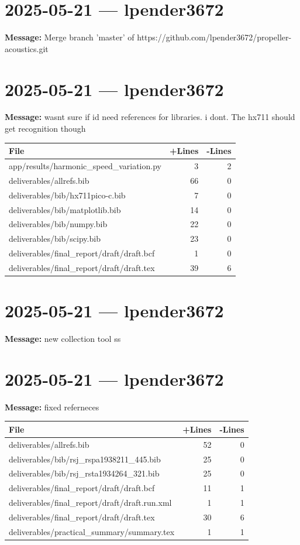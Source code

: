 \documentclass{article}
\begin{document}
\section*{2025-05-21 --- lpender3672}
\textbf{Message:} Merge branch 'master' of https://github.com/lpender3672/propeller-acoustics.git

\section*{2025-05-21 --- lpender3672}
\textbf{Message:} wasnt sure if id need references for libraries. i dont. The hx711 should get recognition though

\begin{longtable}{|p{10cm}|r|r|}
\hline \textbf{File} & \textbf{+Lines} & \textbf{-Lines} \\
\hline
app/results/harmonic\_speed\_variation.py & 3 & 2 \\
\hline
deliverables/allrefs.bib & 66 & 0 \\
\hline
deliverables/bib/hx711pico-c.bib & 7 & 0 \\
\hline
deliverables/bib/matplotlib.bib & 14 & 0 \\
\hline
deliverables/bib/numpy.bib & 22 & 0 \\
\hline
deliverables/bib/scipy.bib & 23 & 0 \\
\hline
deliverables/final\_report/draft/draft.bcf & 1 & 0 \\
\hline
deliverables/final\_report/draft/draft.tex & 39 & 6 \\
\hline
\end{longtable}

\section*{2025-05-21 --- lpender3672}
\textbf{Message:} new collection tool ss

\section*{2025-05-21 --- lpender3672}
\textbf{Message:} fixed referneces

\begin{longtable}{|p{10cm}|r|r|}
\hline \textbf{File} & \textbf{+Lines} & \textbf{-Lines} \\
\hline
deliverables/allrefs.bib & 52 & 0 \\
\hline
deliverables/bib/rsj\_rspa1938211\_445.bib & 25 & 0 \\
\hline
deliverables/bib/rsj\_rsta1934264\_321.bib & 25 & 0 \\
\hline
deliverables/final\_report/draft/draft.bcf & 11 & 1 \\
\hline
deliverables/final\_report/draft/draft.run.xml & 1 & 1 \\
\hline
deliverables/final\_report/draft/draft.tex & 30 & 6 \\
\hline
deliverables/practical\_summary/summary.tex & 1 & 1 \\
\hline
\end{longtable}
\end{document}
